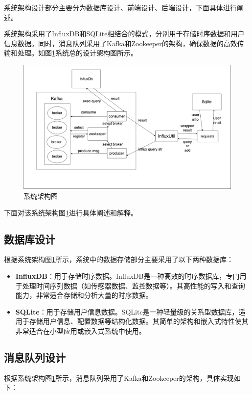 \documentclass[oneside]{xduugthesis}
\begin{document}
系统架构设计部分主要分为数据库设计、前端设计、后端设计，下面具体进行阐述。

系统架构采用了InfluxDB和SQLite相结合的模式，分别用于存储时序数据和用户信息数据。同时，消息队列采用了Kafka和Zookeeper的架构，确保数据的高效传输和处理。如图\ref{fig:architecture}系统总的设计架构图所示。

\begin{figure}[htb]
    \centering
    \includegraphics[width=0.8\linewidth]{images/architecture.png}
    \caption{系统架构图}
    \label{fig:architecture}
\end{figure}

下面对该系统架构图\ref{fig:architecture}进行具体阐述和解释。

\subsection{数据库设计}

根据系统架构图\ref{fig:architecture}所示，系统中的数据存储部分主要采用了以下两种数据库：

\begin{itemize}[nosep]
    \item \textbf{InfluxDB}：用于存储时序数据。InfluxDB是一种高效的时序数据库，专门用于处理时间序列数据（如传感器数据、监控数据等）。其高性能的写入和查询能力，非常适合存储和分析大量的时序数据。
    \item \textbf{SQLite}：用于存储用户信息数据。SQLite是一种轻量级的关系型数据库，适用于存储用户信息、配置数据等结构化数据。其简单的架构和嵌入式特性使其非常适合在小型应用或嵌入式系统中使用。
\end{itemize}

\subsection{消息队列设计}

根据系统架构图\ref{fig:architecture}所示，消息队列采用了Kafka和Zookeeper的架构，具体实现如下：
\end{document}
